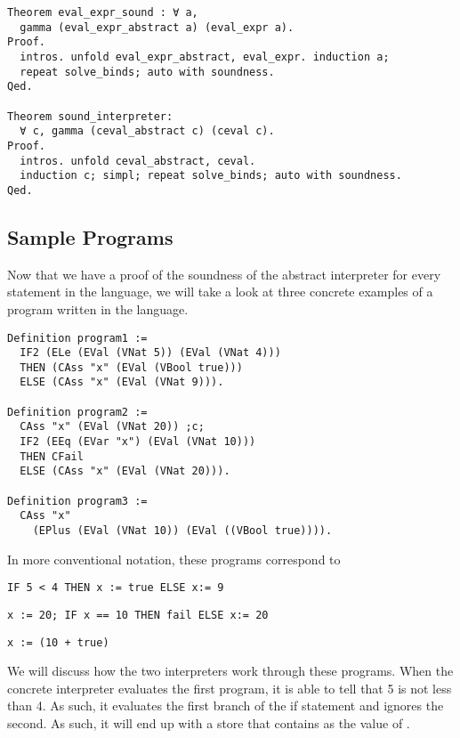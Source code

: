 {\begin{verbatim}
Theorem eval_expr_sound : ∀ a,
  gamma (eval_expr_abstract a) (eval_expr a).
Proof.
  intros. unfold eval_expr_abstract, eval_expr. induction a; 
  repeat solve_binds; auto with soundness. 
Qed.

Theorem sound_interpreter:
  ∀ c, gamma (ceval_abstract c) (ceval c).
Proof.
  intros. unfold ceval_abstract, ceval. 
  induction c; simpl; repeat solve_binds; auto with soundness.
Qed.
\end{verbatim}

\subsection{Sample Programs}
Now that we have a proof of the soundness of the abstract interpreter for every
statement in the language, we will take a look at three concrete examples of a
program written in the language. 

\begin{verbatim}
Definition program1 := 
  IF2 (ELe (EVal (VNat 5)) (EVal (VNat 4))) 
  THEN (CAss "x" (EVal (VBool true))) 
  ELSE (CAss "x" (EVal (VNat 9))).

Definition program2 :=
  CAss "x" (EVal (VNat 20)) ;c;
  IF2 (EEq (EVar "x") (EVal (VNat 10)))
  THEN CFail
  ELSE (CAss "x" (EVal (VNat 20))).

Definition program3 :=
  CAss "x" 
  	(EPlus (EVal (VNat 10)) (EVal ((VBool true)))).
\end{verbatim}

In more conventional notation, these programs correspond to

\begin{lstlisting}
IF 5 < 4 THEN x := true ELSE x:= 9
\end{lstlisting}

\begin{lstlisting}
x := 20; IF x == 10 THEN fail ELSE x:= 20
\end{lstlisting}

\begin{lstlisting}
x := (10 + true)
\end{lstlisting}

We will discuss how the two interpreters work through these programs. When the
concrete interpreter evaluates the first program, it is able to tell that 5 is
not less than 4. As such, it evaluates the first branch of the if statement and
ignores the second. As such, it will end up with a store that contains
 as the value of .

}
